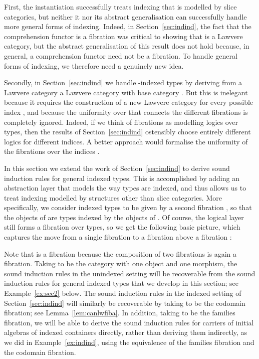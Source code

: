 \documentclass{LMCS}
\theoremstyle{plain}
\theoremstyle{remark}
\theoremstyle{definition}
\begin{document}
\begin{iteMize}{}
\item First, the instantiation successfully treats indexing that is
  modelled by slice categories, but neither it nor its abstract
  generalisation can successfully handle more general forms of
  indexing. Indeed, in Section~\ref{sec:indind}, the fact that the
  comprehension functor  is a fibration was critical to
  showing that  is a Lawvere category, but the abstract
  generalisation of this result does not hold because, in general, a
  comprehension functor need not be a fibration. To handle general
  forms of indexing, we therefore need a genuinely new idea.

\item Secondly, in Section~\ref{sec:indind} we handle -indexed
  types by deriving from a Lawvere category  a Lawvere
  category  with base category . But this is inelegant
  because it requires the construction of a new Lawvere category for
  every possible index , and because the uniformity over  that
  connects the different fibrations  is completely ignored.
  Indeed, if we think of fibrations as modelling logics over types,
  then the results of Section~\ref{sec:indind} ostensibly choose
  entirely different logics for different indices. A better approach
  would formalise the uniformity of the fibrations  over the
  indices .
\end{iteMize}

\vspace*{0.1in}

\noindent In this section we extend the work of Section~\ref{sec:indind} to
derive sound induction rules for general indexed types. This is
accomplished by adding an abstraction layer that models the way types
are indexed, and thus allows us to treat indexing modelled by
structures other than slice categories. More specifically, we consider
indexed types to be given by a second fibration , so that
the objects of  are types indexed by the objects of . Of
course, the logical layer still forms a fibration  over
types, so we get the following basic picture, which captures the move
from a single fibration  to a fibration  above a fibration :
 

\vspace{0.1in}

\noindent
Note that  is a fibration because the composition of two
fibrations is again a fibration. Taking  to be the
category with one object and one morphism, the sound induction rules
in the unindexed setting will be recoverable from the sound induction
rules for general indexed types that we develop in this section; see
Example~\ref{ex:sec2} below. The sound induction rules in the indexed
setting of Section~\ref{sec:indind} will similarly be recoverable by
taking  to be the codomain fibration; see
Lemma~\ref{lem:canlwfiba}.  In addition, taking  to be the families
fibration, we will be able to derive the sound induction rules for
carriers of initial algebras of indexed containers directly, rather
than deriving them indirectly, as we did in Example~\ref{ex:indind},
using the equivalence of the families fibration and the codomain
fibration.
\end{document}
